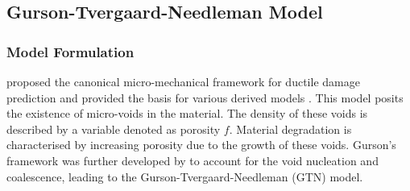\documentclass[sn-mathphys,Numbered]{sn-jnl}%
\begin{document}
\subsection{Gurson-Tvergaard-Needleman Model}

\subsubsection{Model Formulation}

\citet{gurson_continuum_1977} proposed the canonical micro-mechanical framework for ductile damage prediction and provided the basis for various derived models \citep{besson_continuum_2010, bettaieb_numerical_2011, achouri_numerical_2013, cao_models_2017, tekkaya_damage_2020}.
This model posits the existence of micro-voids in the material.
The density of these voids is described by a variable denoted as porosity $f$.
Material degradation is characterised by increasing porosity due to the growth of these voids.
Gurson’s framework was further developed by \citet{tvergaard_analysis_1984} to account for the void nucleation and coalescence, leading to the Gurson-Tvergaard-Needleman (GTN) model.

\end{document}
